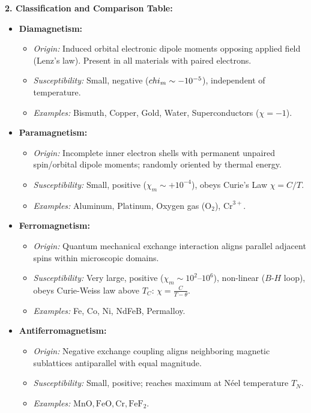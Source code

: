 \begin{theorysol}
\textbf{2. Classification and Comparison Table:}
\begin{itemize}
\item \textbf{Diamagnetism:}
  \begin{itemize}
  \item \textit{Origin:} Induced orbital electronic dipole moments opposing applied field (Lenz's law). Present in all materials with paired electrons.
  \item \textit{Susceptibility:} Small, negative ($\\chi_m \sim -10^{-5}$), independent of temperature.
  \item \textit{Examples:} Bismuth, Copper, Gold, Water, Superconductors ($\chi=-1$).
  \end{itemize}
\item \textbf{Paramagnetism:}
  \begin{itemize}
  \item \textit{Origin:} Incomplete inner electron shells with permanent unpaired spin/orbital dipole moments; randomly oriented by thermal energy.
  \item \textit{Susceptibility:} Small, positive ($\chi_m \sim +10^{-4}$), obeys Curie's Law $\chi = C/T$.
  \item \textit{Examples:} Aluminum, Platinum, Oxygen gas ($\text{O}_2$), $\text{Cr}^{3+}$.
  \end{itemize}
\item \textbf{Ferromagnetism:}
  \begin{itemize}
  \item \textit{Origin:} Quantum mechanical exchange interaction aligns parallel adjacent spins within microscopic domains.
  \item \textit{Susceptibility:} Very large, positive ($\chi_m \sim 10^2\text{--}10^6$), non-linear ($B$-$H$ loop), obeys Curie-Weiss law above $T_C$: $\chi = \frac{C}{T - \theta}$.
  \item \textit{Examples:} Fe, Co, Ni, NdFeB, Permalloy.
  \end{itemize}
\item \textbf{Antiferromagnetism:}
  \begin{itemize}
  \item \textit{Origin:} Negative exchange coupling aligns neighboring magnetic sublattices antiparallel with equal magnitude.
  \item \textit{Susceptibility:} Small, positive; reaches maximum at Néel temperature $T_N$.
  \item \textit{Examples:} $\text{MnO}, \text{FeO}, \text{Cr}, \text{FeF}_2$.

\end{itemize}
\end{itemize}
\end{theorysol}

